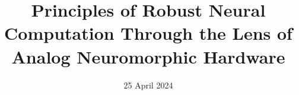 \documentclass[11pt,twoside,a5paper,fleqn]{scrbook}
\title{Principles of Robust Neural Computation Through the Lens of Analog Neuromorphic Hardware}
\date{25 April 2024}
\newcommand{\sectionbreak}{\clearpage}
\begin{document}


\newlength{\originalVOffset}
 \newlength{\originalHOffset}
 \setlength{\originalVOffset}{\voffset}   
 \setlength{\originalHOffset}{\hoffset}
 \setlength{\voffset}{0cm}
 \setlength{\hoffset}{0cm}
 
 \setlength{\voffset}{\originalVOffset}
 \setlength{\hoffset}{\originalHOffset}

\maketitle 							%

\clearpage
\thispagestyle{empty}
\vspace*{\fill}
 




\pagestyle{fancy}               	%


\renewcommand\sectionbreak{} 

\newpage


\newpage


\newpage


\newpage

\renewcommand{\sectionbreak}{\clearpage}

\renewcommand\sectionbreak{} 


\newpage


\newpage

\renewcommand\sectionbreak{} 

\appendix
\begin{appendices}





%

\end{appendices}
\end{document}
